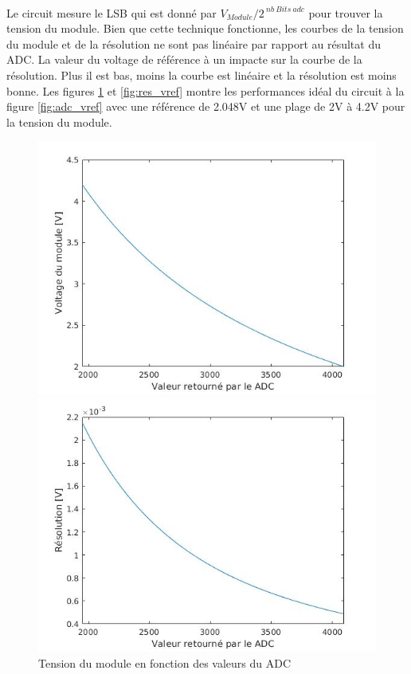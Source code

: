 	\paragraph*{}
	Le circuit mesure le LSB qui est donné par $V_{Module} / 2^{~nb~Bits~adc}$ pour  trouver la tension du module. Bien que cette technique fonctionne, les courbes de la tension du module et de la résolution ne sont pas linéaire par rapport au résultat du ADC. La valeur du voltage de référence à un impacte sur la courbe de la résolution. Plus il est bas, moins la courbe est linéaire et la résolution est moins bonne. Les figures \ref{fig:vmodule_vref} et \ref{fig:res_vref} montre les performances idéal du circuit à la figure \ref{fig:adc_vref} avec une référence de 2.048V et une plage de 2V à 4.2V pour la tension du module.
	
	\begin{figure}[H]
		\begin{minipage}{0.45\textwidth}
			\centering
			\includegraphics[scale=0.4]{Images/Vmodule_REF_2V.jpg}
			\caption{Tension du module en fonction des valeurs du ADC}
			\label{fig:vmodule_vref}
		\end{minipage}
		\hfill
		\begin{minipage}{0.45\textwidth}
			\centering
			\includegraphics[scale=0.4]{Images/RES_REF_2V.jpg}

\end{minipage}
\end{figure}
